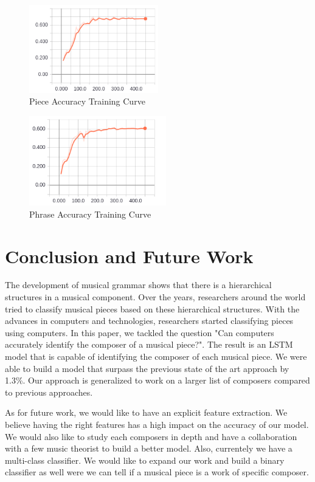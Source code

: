 \documentclass[11pt,a4paper]{article}
\begin{document}
\begin{figure}[h]
\caption{Piece Accuracy Training Curve}
\centering
\includegraphics[width=0.5\textwidth]{group_acc.png}
\end{figure}

\begin{figure}[h]
\caption{Phrase Accuracy Training Curve}
\centering
\includegraphics[width=0.53\textwidth]{phrase_acc.png}
\end{figure}


\section{Conclusion and Future Work}

The development of musical grammar shows that there is a hierarchical structures in a musical component. Over the years, researchers around the world tried to classify musical pieces based on these hierarchical structures. With the advances in computers and technologies, researchers started classifying pieces using computers. In this paper, we tackled the question "Can computers accurately identify the composer of a musical piece?". The result is an LSTM model that is capable of identifying the composer of each musical piece. We were able to build a model that surpass the previous state of the art approach by 1.3\%. Our approach is generalized to work on a larger list of composers compared to previous approaches. 

As for future work, we would like to have an explicit feature extraction. We believe having the right features has a high impact on the accuracy of our model. We would also like to study each composers in depth and have a collaboration with a few music theorist to build a better model. Also, currentely we have a multi-class classifier. We would like to expand our work and build a binary classifier as well were we can tell if a musical piece is a work of specific composer. 






\appendix
\end{document}
